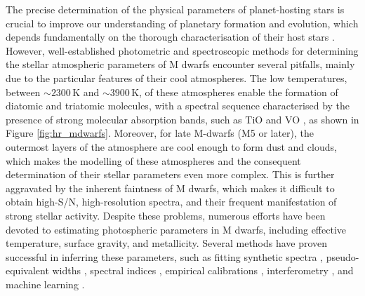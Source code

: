 The precise determination of the physical parameters of planet-hosting stars is crucial to improve our understanding of planetary formation and evolution, which depends fundamentally on the thorough characterisation of their host stars \citep{souto2017,cifuentes2020}. However, well-established photometric and spectroscopic methods for determining the stellar atmospheric parameters of M dwarfs encounter several pitfalls, mainly due to the particular features of their cool atmospheres. The low temperatures, between $\sim2300$\,K and $\sim3900$\,K, of these atmospheres enable the formation of diatomic and triatomic molecules, with a spectral sequence characterised by the presence of strong molecular absorption bands, such as TiO and VO \citep{joy1947,keenan1952,boeshaar1976}, as shown in Figure \ref{fig:hr_mdwarfs}. Moreover, for late M-dwarfs (M5 or later), the outermost layers of the atmosphere are cool enough to form dust and clouds, which makes the modelling of these atmospheres and the consequent determination of their stellar parameters even more complex. This is further aggravated by the inherent faintness of M dwarfs, which makes it difficult to obtain high-S/N, high-resolution spectra, and their frequent manifestation of strong stellar activity. Despite these problems, numerous efforts have been devoted to estimating photospheric parameters in M dwarfs, including effective temperature, surface gravity, and metallicity. Several methods have proven successful in inferring these parameters, such as fitting synthetic spectra \citep{bayo2017,pass18,Rajpurohit2018,pass2019,schw19,Souto2020,mar21,Sarmento2021}, pseudo-equivalent widths \citep{Mann2013,Mann2014,Neves2014,Khata2020,almendros2022},
spectral indices \citep{RojasAyala2010,bayo2011,Rojas2012,Khata2020}, empirical calibrations \citep{casagrande08,Neves2012,rojasayala2014,Rodriguez2019}, interferometry \citep{Boyajian2012,Rabus2019}, and machine learning  \citep{Sarro2018,Antoniadis2020,pass20,Li2021,bello2023,masbuitrago2024,rains2024}.

